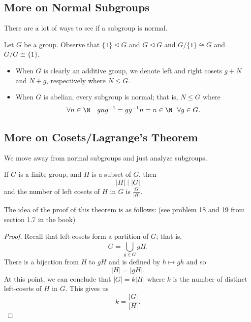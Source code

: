 \subsection{More on Normal Subgroups}

There are a lot of ways to see if a subgroup is normal.  

\begin{remark}[Important]
    Let \( G  \) be a group. Observe that \( \{  1  \}  \trianglelefteq G  \) and \( G \trianglelefteq G   \) and \( G / \{  1  \}  \cong G  \) and \( G / G \cong \{  1  \}  \).
\end{remark}

\begin{itemize}
    \item When \( G  \) is clearly an additive group, we denote left and right cosets \( g  + N  \) and \( N + g  \), respectively where \( N \leq G  \).
    \item When \( G  \) is abelian, every subgroup is normal; that is, \( N \leq G  \) where 
        \[  \forall n \in \N  \ \ \ gn g^{-1} = g g^{-1} n = n \in \N \ \ \forall g \in G.  \]
\end{itemize}

\subsection{More on Cosets/Lagrange's Theorem}

We move away from normal subgroups and just analyze subgroups.

\begin{theorem}
  If \( G  \) is a finite group, and \( H  \) is a subset of \( G  \), then   
  \[  | H  | \mid | G | \]
  and the number of left cosets of \( H  \) in \( G  \) is \( \frac{ | G |  }{  | H |  }  \).
\end{theorem}
The idea of the proof of this theorem is as follows: (see problem 18 and 19 from section 1.7 in the book)
\begin{proof}
Recall that left cosets form a partition of \( G  \); that is, 
\[  G = \bigcup_{  g \in G  }^{  }  g H.  \]
There is a bijection from \( H  \) to \( gH  \) and is defined by \( h \mapsto gh \) and so 
\[  | H |  = | g H  |. \]
At this point, we can conclude that \(  | G  |  = k | H |  \) where \( k  \) is the number of distinct left-cosets of \( H  \) in \( G  \). This gives us 
\[  k = \frac{ | G |   }{  | H |  }. \]
\end{proof}

